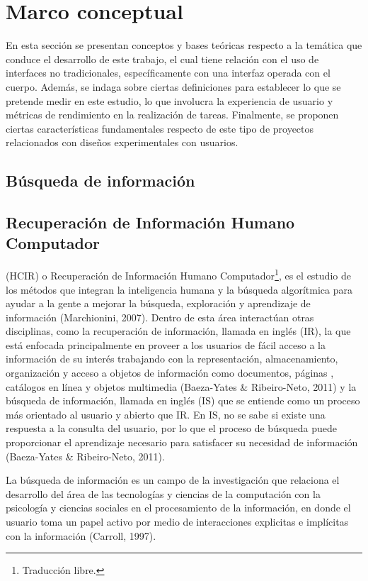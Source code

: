 \section{Marco conceptual}
\label{sec:marco_conceptual}
En esta sección se presentan conceptos y bases teóricas respecto a la temática que conduce el desarrollo de este trabajo, el cual tiene relación con el uso de interfaces no tradicionales, específicamente con una interfaz operada con el cuerpo. Además, se indaga sobre ciertas definiciones para establecer lo que se pretende medir en este estudio, lo que involucra la experiencia de usuario y métricas de rendimiento en la realización de tareas. Finalmente, se proponen ciertas características fundamentales respecto de este tipo de proyectos relacionados con diseños experimentales con usuarios.

\subsection{Búsqueda de información}
\label{subsec:busqueda}

\subsection{Recuperación de Información Humano Computador}
\label{subsec:HCIR}
 (HCIR) o Recuperación de Información Humano Computador\footnote{Traducción libre.}, es el estudio de los métodos que integran la inteligencia humana y la búsqueda algorítmica para ayudar a la gente a mejorar la búsqueda, exploración y aprendizaje de información (Marchionini, 2007). Dentro de esta área interactúan otras disciplinas, como la recuperación de información, llamada en inglés  (IR), la que está enfocada principalmente en proveer a los usuarios de fácil acceso a la información de su interés trabajando con la representación, almacenamiento, organización y acceso a objetos de información como documentos, páginas , catálogos en línea y objetos multimedia (Baeza-Yates & Ribeiro-Neto, 2011) y la búsqueda de información, llamada en inglés  (IS) que se entiende como un proceso más orientado al usuario y abierto que IR. En IS, no se sabe si existe una respuesta a la consulta del usuario, por lo que el proceso de búsqueda puede proporcionar el aprendizaje necesario para satisfacer su necesidad de información (Baeza-Yates & Ribeiro-Neto, 2011).

La búsqueda de información es un campo de la investigación que relaciona el desarrollo del área de las tecnologías y ciencias de la computación con la psicología y ciencias sociales en el procesamiento de la información, en donde el usuario toma un papel activo por medio de interacciones explicitas e implícitas con la información (Carroll, 1997).

